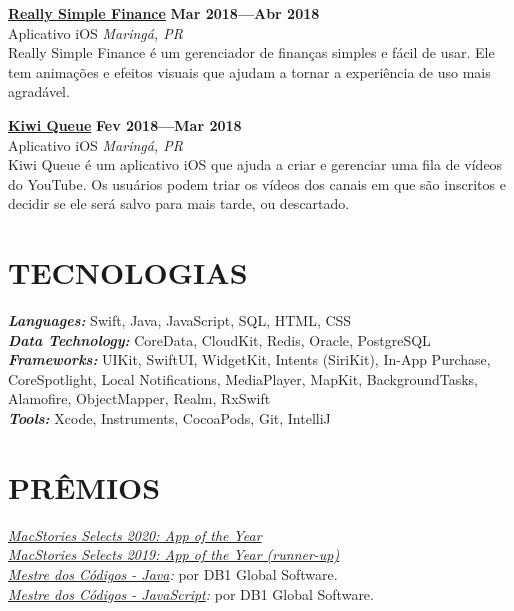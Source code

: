 \documentclass[line,margin]{res}
\begin{document}
\begin{resume}
  {\bf \href{https://itunes.apple.com/us/app/really-simple-finance/id1370859710}{Really Simple Finance}} \hfill {\bf Mar 2018---Abr 2018} \\
  Aplicativo iOS \hfill {\sl Maring\'a, PR}\\[6pt]
  Really Simple Finance é um gerenciador de finanças simples e fácil de usar. Ele tem animações e efeitos visuais que ajudam a tornar a experiência de uso mais agradável.

  {\bf \href{https://itunes.apple.com/us/app/kiwi-queue/id1352747116}{Kiwi Queue}} \hfill {\bf Fev 2018---Mar 2018} \\
  Aplicativo iOS \hfill {\sl Maring\'a, PR}\\[6pt]
  Kiwi Queue é um aplicativo iOS que ajuda a criar e gerenciar uma fila de vídeos do YouTube. Os usuários podem triar os vídeos dos canais em que são inscritos e decidir se ele será salvo para mais tarde, ou descartado.


\section{TECNOLOGIAS}
  {\sl {\bf Languages:}} Swift, Java, JavaScript, SQL, HTML, CSS \\
  {\sl {\bf Data Technology:}} CoreData, CloudKit, Redis, Oracle, PostgreSQL \\
  {\sl {\bf Frameworks:}} UIKit, SwiftUI, WidgetKit, Intents (SiriKit), In-App Purchase, CoreSpotlight, Local Notifications, MediaPlayer, MapKit, BackgroundTasks, Alamofire, ObjectMapper, Realm, RxSwift \\
  {\sl {\bf Tools:}} Xcode, Instruments, CocoaPods, Git, IntelliJ


\section{PRÊMIOS}             
  {\sl \href{https://www.macstories.net/stories/macstories-selects-2020-recognizing-the-best-apps-of-the-year/#app-of-the-year}{MacStories Selects 2020: App of the Year}}\\
  {\sl \href{https://www.macstories.net/stories/macstories-selects-2019-recognizing-the-best-apps-of-the-year/#app-of-the-year-runner-up}{MacStories Selects 2019: App of the Year (runner-up)}}\\
  {\sl \href{https://mestredoscodigos.com.br/primeira-entrega-dos-pins-do-mestre-dos-codigos}{Mestre dos C\'odigos - Java}:} por DB1 Global Software.\\
  {\sl \href{https://mestredoscodigos.com.br/primeira-entrega-dos-pins-do-mestre-dos-codigos}{Mestre dos C\'odigos - JavaScript}:} por DB1 Global Software.\\
 

\end{resume}
\end{document}
